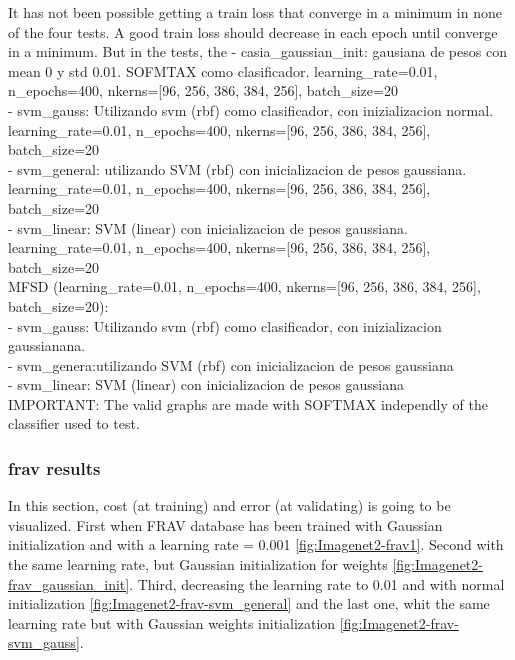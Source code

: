 It has not been possible getting a train loss that converge in a minimum in none of the four tests. A good train loss should decrease in each epoch until converge in a minimum. But in the tests, the
- casia\_gaussian\_init: gausiana de pesos con mean 0 y std 0.01. SOFMTAX como clasificador. learning\_rate=0.01, n\_epochs=400, nkerns=[96, 256, 386, 384, 256], batch\_size=20 \\
- svm\_gauss: Utilizando svm (rbf) como clasificador, con inizializacion normal. learning\_rate=0.01, n\_epochs=400, nkerns=[96, 256, 386, 384, 256], batch\_size=20\\
- svm\_general: utilizando SVM (rbf) con inicializacion de pesos gaussiana. learning\_rate=0.01, n\_epochs=400, nkerns=[96, 256, 386, 384, 256], batch\_size=20\\
- svm\_linear: SVM (linear) con inicializacion de pesos gaussiana. learning\_rate=0.01, n\_epochs=400, nkerns=[96, 256, 386, 384, 256], batch\_size=20\\

MFSD  (learning\_rate=0.01, n\_epochs=400, nkerns=[96, 256, 386, 384, 256], batch\_size=20):\\
- svm\_gauss: Utilizando svm (rbf) como clasificador, con inizializacion gaussianana.\\
- svm\_genera:utilizando SVM (rbf) con inicializacion de pesos gaussiana \\
- svm\_linear: SVM (linear) con inicializacion de pesos gaussiana\\

IMPORTANT: The valid graphs are made with SOFTMAX independly of the classifier used to test.\\

\subsubsection{frav results}

In this section, cost (at training) and error (at validating) is going to be visualized. First when FRAV database has been trained with Gaussian initialization and with a learning rate = 0.001 \ref{fig:Imagenet2-frav1}. Second with the same learning rate, but Gaussian initialization for weights \ref{fig:Imagenet2-frav_gaussian_init}. Third, decreasing the learning rate to 0.01 and with normal initialization \ref{fig:Imagenet2-frav-svm_general} and the last one, whit the same learning rate but with Gaussian weights initialization \ref{fig:Imagenet2-frav-svm_gauss}.\\


